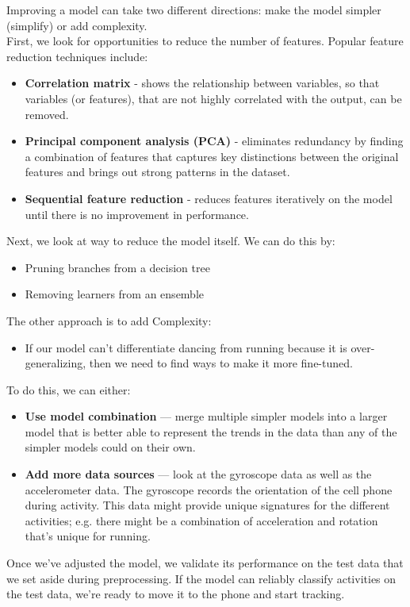 \documentclass[a4paper]{article}
\begin{document}
			Improving a model can take two different directions:
			make the model simpler (simplify) or add complexity. \\
		\noindent
			First, we look for opportunities to reduce the number of features.
			Popular feature reduction techniques include:
			
			\begin{itemize}
				\item \textbf{Correlation matrix} - shows the relationship between variables, so that variables (or features), that are not highly correlated with the output, can be removed.
				\item \textbf{Principal component analysis (PCA)} - eliminates redundancy by finding a combination of features that captures key distinctions between the original features and brings out strong patterns in the dataset.
				\item \textbf{Sequential feature reduction} - reduces features iteratively on the model until there is no improvement in performance.
			\end{itemize}
		\noindent
			Next, we look at way to reduce the model itself.
			We can do this by:
				\begin{itemize}
					\item Pruning branches from a decision tree
					\item Removing learners from an ensemble
				\end{itemize}
		\noindent
			The other approach is to add Complexity:
			\begin{itemize}
				\item If our model can't differentiate dancing from running because it is over-generalizing, then we need to find ways to make it more fine-tuned.
			\end{itemize}
			To do this, we can either:
			\begin{itemize}
				\item \textbf{Use model combination} — merge multiple simpler models into a larger model that is better able to represent the trends in the data than any of the simpler models could on their own.
				\item \textbf{Add more data sources} — look at the gyroscope data as well as the accelerometer data.
					The gyroscope records the orientation of the cell phone during activity.
					This data might provide unique signatures for the different activities;
					e.g. there might be a combination of acceleration and rotation that's unique for running.
			\end{itemize}
			Once we've adjusted the model, we validate its performance on the test data that we set aside during preprocessing.
			If the model can reliably classify activities on the test data, we're ready to move it to the phone and start tracking.
		
\end{document}
